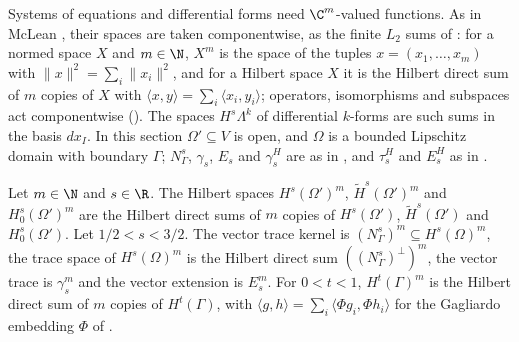 Systems of equations and differential forms need $\C^m$-valued functions. As in McLean
\cite[Chapter 4]{McLean}, their spaces are taken componentwise, as the finite $L_2$ sums of
: for a normed space $X$ and $m \in \N$, $X^m$ is the space of the tuples
$x = (x_1, \dots, x_m)$ with $\|x\|^2 = \sum_i \|x_i\|^2$, and for a Hilbert space $X$ it is the
Hilbert direct sum of $m$ copies of $X$ with
$\langle x, y \rangle = \sum_i \langle x_i, y_i \rangle$; operators, isomorphisms and subspaces
act componentwise (). The spaces $H^s\Lambda^k$ of differential $k$-forms
are such sums in the basis $dx_I$. In this section $\Omega' \subseteq V$ is open, and $\Omega$ is
a bounded Lipschitz domain with boundary $\Gamma$; $N^s_\Gamma$, $\gamma_s$, $E_s$ and
$\gamma^H_s$ are as in , and $\tau^H_s$ and $E^H_s$ as in
.

\begin{definition}
\label{def:vector-sobolev-spaces}
\leanok
{}
Let $m \in \N$ and $s \in \R$. The Hilbert spaces $H^s(\Omega')^m$, $\tilde H^s(\Omega')^m$ and
$H^s_0(\Omega')^m$ are the Hilbert direct sums of $m$ copies of $H^s(\Omega')$,
$\tilde H^s(\Omega')$ and $H^s_0(\Omega')$. Let $1/2 < s < 3/2$. The vector trace kernel is
$(N^s_\Gamma)^m \subseteq H^s(\Omega)^m$, the trace space of $H^s(\Omega)^m$ is the Hilbert
direct sum $((N^s_\Gamma)^\perp)^m$, the vector trace is $\gamma_s^m$ and the vector extension is
$E_s^m$. For $0 < t < 1$, $H^t(\Gamma)^m$ is the Hilbert direct sum of $m$ copies of
$H^t(\Gamma)$, with $\langle g, h \rangle = \sum_i \langle \Phi g_i, \Phi h_i \rangle$ for the
Gagliardo embedding $\Phi$ of .
\end{definition}

